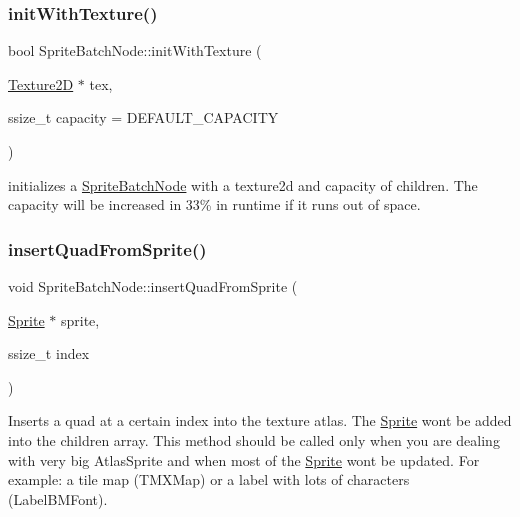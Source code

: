 \subsubsection{\texorpdfstring{init\+With\+Texture()}{initWithTexture()}\hspace{0.1cm}{\footnotesize\ttfamily [2/2]}}
{\footnotesize\ttfamily bool Sprite\+Batch\+Node\+::init\+With\+Texture (\begin{DoxyParamCaption}\item[{\hyperlink{classTexture2D}{Texture2D} $\ast$}]{tex,  }\item[{ssize\+\_\+t}]{capacity = {\ttfamily DEFAULT\+\_\+CAPACITY} }\end{DoxyParamCaption})}

initializes a \hyperlink{classSpriteBatchNode}{Sprite\+Batch\+Node} with a texture2d and capacity of children. The capacity will be increased in 33\% in runtime if it runs out of space. \mbox{\label{classSpriteBatchNode_ae3aa8d2d53d2e6ba43a03770e8a88a41}} 
\subsubsection{\texorpdfstring{insert\+Quad\+From\+Sprite()}{insertQuadFromSprite()}\hspace{0.1cm}{\footnotesize\ttfamily [1/2]}}
{\footnotesize\ttfamily void Sprite\+Batch\+Node\+::insert\+Quad\+From\+Sprite (\begin{DoxyParamCaption}\item[{\hyperlink{classSprite}{Sprite} $\ast$}]{sprite,  }\item[{ssize\+\_\+t}]{index }\end{DoxyParamCaption})}

Inserts a quad at a certain index into the texture atlas. The \hyperlink{classSprite}{Sprite} won\textquotesingle{}t be added into the children array. This method should be called only when you are dealing with very big Atlas\+Sprite and when most of the \hyperlink{classSprite}{Sprite} won\textquotesingle{}t be updated. For example\+: a tile map (T\+M\+X\+Map) or a label with lots of characters (Label\+B\+M\+Font). \mbox{\label{classSpriteBatchNode_ae3aa8d2d53d2e6ba43a03770e8a88a41}} 
